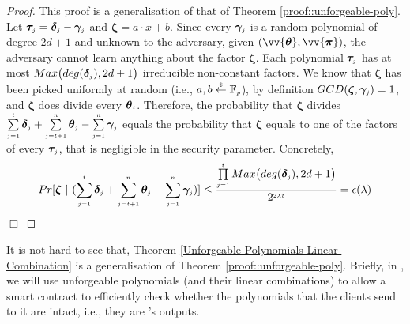 \begin{proof}  
This proof is a generalisation of that of Theorem \ref{proof::unforgeable-poly}.  
Let $\bm\tau_{\scriptscriptstyle j}=\bm\delta_{\scriptscriptstyle j}-\bm\gamma_{\scriptscriptstyle j}$ and $\bm\zeta=a\cdot x+b$. Since  every $\bm\gamma_{\scriptscriptstyle j}$ is a random polynomial of degree $2d+1$ and unknown to the adversary, given $(\vv{\bm\theta}, \vv{\bm\pi})$,  the adversary cannot learn anything about the factor $\bm\zeta$. Each polynomial $\bm\tau_{\scriptscriptstyle j}$ has at most $Max\big(deg(\bm\delta_{\scriptscriptstyle j}), 2d+1\big)$ irreducible non-constant factors. 
%
%
We  know that $\bm\zeta$ has been picked uniformly at random (i.e., $a,b
\stackrel{\scriptscriptstyle \$}\leftarrow \mathbb F_{\scriptscriptstyle p}$), by definition $GCD(\bm\zeta, \bm\gamma_{\scriptscriptstyle j})=1$, and $\bm\zeta$  does divide every $\bm\theta_{\scriptscriptstyle j}$. Therefore, the probability that $\bm\zeta$ divides $\sum\limits_{\scriptscriptstyle j=1}^{\scriptscriptstyle t}\bm\delta_{\scriptscriptstyle j} + \sum\limits_{\scriptscriptstyle j=t+1}^{\scriptscriptstyle n}\bm\theta_{\scriptscriptstyle j} - \sum\limits_{\scriptscriptstyle j=1}^{\scriptscriptstyle n}\bm\gamma_{\scriptscriptstyle j}$ equals the probability that $\bm\zeta$ equals to one of the factors of  every $\bm\tau_{\scriptscriptstyle j}$, that is negligible in the security parameter. Concretely,
%
$$Pr[ \bm\zeta \ | \ (\sum\limits_{\scriptscriptstyle j=1}^{\scriptscriptstyle t}\bm\delta_{\scriptscriptstyle j} + \sum\limits_{\scriptscriptstyle j=t+1}^{\scriptscriptstyle n}\bm\theta_{\scriptscriptstyle j} - \sum\limits_{\scriptscriptstyle j=1}^{\scriptscriptstyle n}\bm\gamma_{\scriptscriptstyle j} ) ]\leq  \frac{\prod \limits^{\scriptscriptstyle t}_{\scriptscriptstyle j=1}Max\big(deg(\bm\delta_{\scriptscriptstyle j}), 2d+1\big)} {2^{\scriptscriptstyle 2\lambda t}}=\epsilon(\lambda)$$
%
\hfill\(\Box\)
\end{proof} 


It is not hard to see that, Theorem \ref{Unforgeable-Polynomials-Linear-Combination} is a generalisation of Theorem \ref{proof::unforgeable-poly}. Briefly, in \withFai, we will use unforgeable polynomials (and their linear combinations) to allow a smart contract to efficiently check whether the polynomials that the clients send to it are intact, i.e., they are \vopr's outputs.







